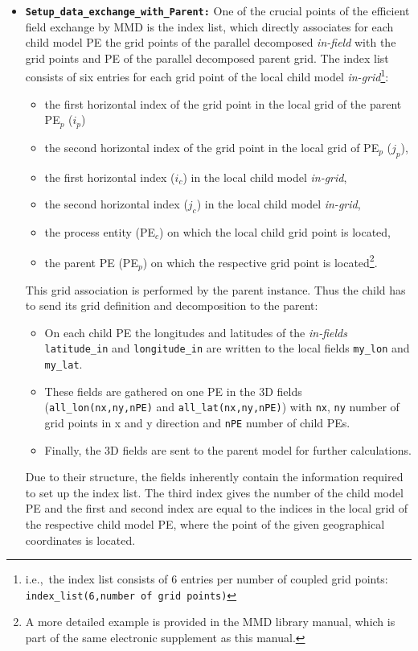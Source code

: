 \documentclass[11pt,twoside]{article}
\begin{document}
\begin{itemize}
\item {\tt \bf Setup\_data\_exchange\_with\_Parent:}
One of the crucial points of the efficient field exchange by MMD is the 
index list, which directly associates for each child model PE the grid points 
of the parallel decomposed {\it in-field} with the grid points 
and PE of the parallel decomposed parent grid.
The index list consists of six entries for each grid point of
the local child model {\it in-grid}\footnote{i.e.,\ the index list consists of 6 entries
per number of coupled grid points: {\tt index\_list(6,number of grid points)}}:
\begin{itemize}%
\item[1.)] the first horizontal index of the grid point in the local
grid of the parent PE$_p$ ($i_p$)
\item[2.)] the second horizontal index of the grid point in the local
grid of PE$_p$ ($j_p$), 
\item[3.)] the first horizontal index ($i_c$) in the local child model
{\it in-grid},
\item[4.)] the second horizontal index ($j_c$) in the local child model {\it in-grid},
\item[5.)] the process entity (PE$_c$) on which the local child grid point is 
located,
\item[6.)] the parent PE (PE$_p$) on which the respective grid point is 
located\footnote{A more detailed example is provided in the
 MMD library manual, which is part of the same electronic supplement as this
 manual.}.
\end{itemize}%
This grid association is performed by the parent instance. Thus the
child has to send its grid definition and decomposition to the parent:
\begin{itemize}%
 \item On each child PE the longitudes and latitudes of the {\it in-fields} 
\verb|latitude_in| and \verb|longitude_in| are written to the local fields
\verb|my_lon| and \verb|my_lat|. 
\item These fields are gathered on one PE in the 
3D fields (\verb|all_lon(nx,ny,nPE)| and 
\verb|all_lat(nx,ny,nPE)|) with \verb|nx|, \verb|ny| number of grid points in
x and y direction and \verb|nPE| number of child PEs. 
\item Finally, the 3D fields are sent
to the parent model for further calculations.
\end{itemize}%
Due to their structure, the fields
inherently contain the information required to set up the index list. The
third index gives the number of the child model PE and the first and
second index 
are equal to the indices in the local grid of the respective child
model PE, where the point of the given geographical coordinates is located.


\end{itemize}
\end{document}
